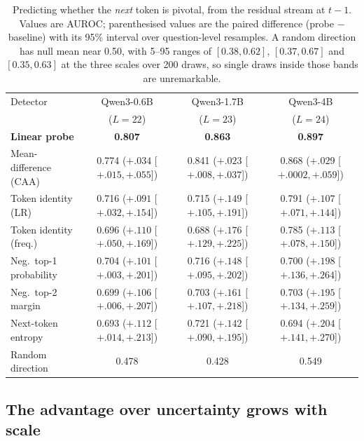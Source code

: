 \documentclass{article}
\begin{document}
\begin{table}[t]
  \centering
  \caption{Predicting whether the \emph{next} token is pivotal, from the
  residual stream at $t-1$. Values are AUROC; parenthesised values are the
  paired difference (probe $-$ baseline) with its 95\% interval over
  question-level resamples. A random direction has null mean near 0.50, with
  5--95 ranges of $[0.38, 0.62]$, $[0.37, 0.67]$ and $[0.35, 0.63]$ at the
  three scales over 200 draws, so single draws inside those bands are
  unremarkable.}
  \label{tab:main}
  \small
  \setlength{\tabcolsep}{3pt}
  \begin{tabular}{lccc}
    \toprule
    Detector & Qwen3-0.6B & Qwen3-1.7B & Qwen3-4B \\
    & ($L{=}22$) & ($L{=}23$) & ($L{=}24$) \\
    \midrule
    \textbf{Linear probe} & \textbf{0.807} & \textbf{0.863} & \textbf{0.897} \\
    Mean-difference (CAA) & 0.774 \tiny{($+.034$ [$+.015,+.055$])} & 0.841 \tiny{($+.023$ [$+.008,+.037$])} & 0.868 \tiny{($+.029$ [$+.0002,+.059$])} \\
    \midrule
    Token identity (LR) & 0.716 \tiny{($+.091$ [$+.032,+.154$])} & 0.715 \tiny{($+.149$ [$+.105,+.191$])} & 0.791 \tiny{($+.107$ [$+.071,+.144$])} \\
    Token identity (freq.) & 0.696 \tiny{($+.110$ [$+.050,+.169$])} & 0.688 \tiny{($+.176$ [$+.129,+.225$])} & 0.785 \tiny{($+.113$ [$+.078,+.150$])} \\
    \midrule
    Neg.\ top-1 probability & 0.704 \tiny{($+.101$ [$+.003,+.201$])} & 0.716 \tiny{($+.148$ [$+.095,+.202$])} & 0.700 \tiny{($+.198$ [$+.136,+.264$])} \\
    Neg.\ top-2 margin & 0.699 \tiny{($+.106$ [$+.006,+.207$])} & 0.703 \tiny{($+.161$ [$+.107,+.218$])} & 0.703 \tiny{($+.195$ [$+.134,+.259$])} \\
    Next-token entropy & 0.693 \tiny{($+.112$ [$+.014,+.213$])} & 0.721 \tiny{($+.142$ [$+.090,+.195$])} & 0.694 \tiny{($+.204$ [$+.141,+.270$])} \\
    \midrule
    Random direction & 0.478 & 0.428 & 0.549 \\
    \bottomrule
  \end{tabular}
\end{table}

\subsection{The advantage over uncertainty grows with scale}
\label{sec:scaling}
\end{document}
